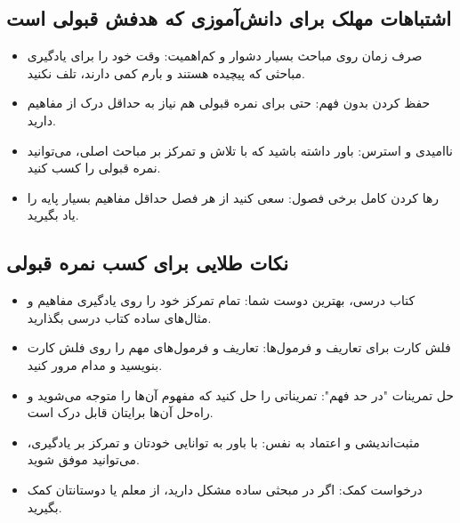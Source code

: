 \documentclass[12pt]{article}
\newcommand{\休息}[1]{\par\centering\textit{#1}\par\vspace{1ex}} %
\begin{document}
\subsection*{اشتباهات مهلک برای دانش‌آموزی که هدفش قبولی است}
\begin{itemize}
    \item صرف زمان روی مباحث بسیار دشوار و کم‌اهمیت: وقت خود را برای یادگیری مباحثی که پیچیده هستند و بارم کمی دارند، تلف نکنید.
    \item حفظ کردن بدون فهم: حتی برای نمره قبولی هم نیاز به حداقل درک از مفاهیم دارید.
    \item ناامیدی و استرس: باور داشته باشید که با تلاش و تمرکز بر مباحث اصلی، می‌توانید نمره قبولی را کسب کنید.
    \item رها کردن کامل برخی فصول: سعی کنید از هر فصل حداقل مفاهیم بسیار پایه را یاد بگیرید.
\end{itemize}

\subsection*{نکات طلایی برای کسب نمره قبولی}
\begin{itemize}
    \item کتاب درسی، بهترین دوست شما: تمام تمرکز خود را روی یادگیری مفاهیم و مثال‌های ساده کتاب درسی بگذارید.
    \item فلش کارت برای تعاریف و فرمول‌ها: تعاریف و فرمول‌های مهم را روی فلش کارت بنویسید و مدام مرور کنید.
    \item حل تمرینات "در حد فهم": تمریناتی را حل کنید که مفهوم آن‌ها را متوجه می‌شوید و راه‌حل آن‌ها برایتان قابل درک است.
    \item مثبت‌اندیشی و اعتماد به نفس: با باور به توانایی خودتان و تمرکز بر یادگیری، می‌توانید موفق شوید.
    \item درخواست کمک: اگر در مبحثی ساده مشکل دارید، از معلم یا دوستانتان کمک بگیرید.
\end{itemize}
\end{document}
